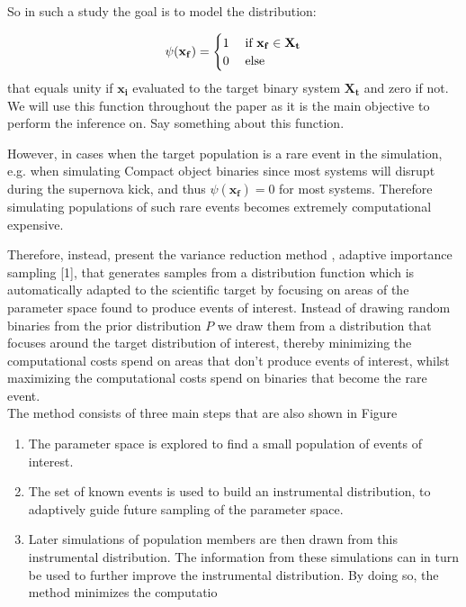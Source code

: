So in such a study the goal is to model the distribution:

\begin{align}
	\psi(\mathbf{x_f}  ) = \begin{cases} 1 \hspace{0.1cm} &\text{if } \mathbf{x_f} \in \mathbf{X_t} \\
	0  & \text{else}
	\end{cases}
\end{align}
that equals unity if $\mathbf{x_i}$ evaluated to the target binary system
$\mathbf{X_t}$ and zero if not. We will use this function throughout the
paper as it is the main objective to perform the inference
on.
Say something about this function.

However, in cases when the target population is a rare event in the simulation, e.g. when simulating Compact object binaries since most systems will disrupt during the supernova kick, and thus  $\psi(\mathbf{x_f}  )= 0 $ for most systems. Therefore simulating populations of such rare events becomes extremely computational expensive. 



Therefore, instead, present the variance reduction method , adaptive importance sampling [1], that generates samples
from a distribution function which is automatically adapted to the scientific target by focusing on areas
of the parameter space found to produce events of interest.
 Instead of drawing random binaries from the prior distribution $P$ we draw them from a distribution that focuses around the target distribution of interest, thereby minimizing the computational costs spend on areas that don't produce events of interest, whilst maximizing the computational costs spend on binaries that become the rare event. \\

The method consists of three main steps that are also shown in Figure 

\begin{enumerate}
	\item  The parameter space is explored to find a small population of events of interest.
	\item  The set of known events is used to build an instrumental distribution, to adaptively
guide future sampling of the parameter space.
	\item  Later simulations of population members are then drawn from this instrumental
distribution. The information from these simulations can in turn be used to
further improve the instrumental distribution.
By doing so, the method minimizes the computatio
\end{enumerate}




